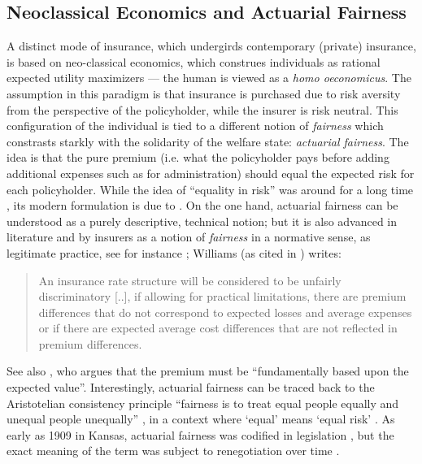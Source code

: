 \documentclass[11pt]{article} %
\begin{document}
\subsection{Neoclassical Economics and Actuarial Fairness}
\label{sec:neoclassical}
A distinct mode of insurance, which undergirds contemporary (private) insurance, is based on neo-classical economics, which construes individuals as rational expected utility maximizers --- the human is viewed as a \textit{homo oeconomicus}. The assumption in this paradigm is that insurance is purchased due to risk aversity from the perspective of the policyholder, while the insurer is risk neutral. 
This configuration of the individual is tied to a different notion of \textit{fairness} which constrasts starkly with the solidarity of the welfare state: \textit{actuarial fairness}. The idea is that the pure premium (i.e. what the policyholder pays before adding additional expenses such as for administration) should equal the expected risk for each policyholder. While the idea of ``equality in risk'' was around for a long time \citep{martinez2016fair}, its modern formulation is due to \citet{arrow1963uncertainty}.
On the one hand, actuarial fairness can be understood as a purely descriptive, technical notion; but it is also advanced in literature and by insurers as a notion of \textit{fairness} in a normative sense, as legitimate practice, see for instance
\citep{clifford1987aids,daniels1990insurability,stone2001admissions,thiery2006fairness}; Williams (as cited in \citep{miller2009disparate}) writes:
\begin{quote}
    An insurance rate structure will be considered to be unfairly discriminatory [..], if allowing for practical limitations, there are premium differences that do not
correspond to expected losses and average expenses or if there are expected
average cost differences that are not reflected in premium differences.
\end{quote}
See also \citep{walters1981risk}, who argues that the premium must be ``fundamentally based upon the expected value''.
Interestingly, actuarial fairness can be traced back to the Aristotelian consistency principle ``fairness is to treat equal people equally and unequal people unequally'' \citep{landes2015fair}, in a context where `equal' means `equal risk' \citep{martinez2016fair}. As early as 1909 in Kansas, actuarial fairness was codified in legislation \citep{miller2009disparate}, but the exact meaning of the term was subject to renegotiation over time \citep{meyers2018enacting,barry2020insurance}.
\end{document}
